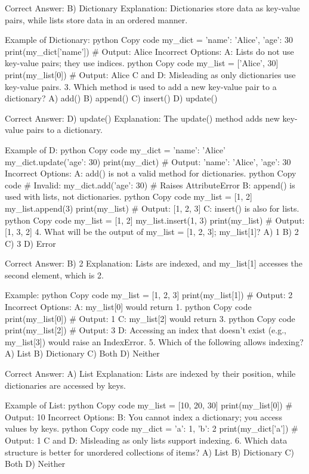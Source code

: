 Correct Answer: B) Dictionary
Explanation: Dictionaries store data as key-value pairs, while lists store data in an ordered manner.

Example of Dictionary:
python
Copy code
my_dict = {'name': 'Alice', 'age': 30}
print(my_dict['name'])  # Output: Alice
Incorrect Options:
A: Lists do not use key-value pairs; they use indices.
python
Copy code
my_list = ['Alice', 30]
print(my_list[0])  # Output: Alice
C and D: Misleading as only dictionaries use key-value pairs.
3. Which method is used to add a new key-value pair to a dictionary?
A) add()
B) append()
C) insert()
D) update()

Correct Answer: D) update()
Explanation: The update() method adds new key-value pairs to a dictionary.

Example of D:
python
Copy code
my_dict = {'name': 'Alice'}
my_dict.update({'age': 30})
print(my_dict)  # Output: {'name': 'Alice', 'age': 30}
Incorrect Options:
A: add() is not a valid method for dictionaries.
python
Copy code
# Invalid: my_dict.add({'age': 30})  # Raises AttributeError
B: append() is used with lists, not dictionaries.
python
Copy code
my_list = [1, 2]
my_list.append(3)
print(my_list)  # Output: [1, 2, 3]
C: insert() is also for lists.
python
Copy code
my_list = [1, 2]
my_list.insert(1, 3)
print(my_list)  # Output: [1, 3, 2]
4. What will be the output of my_list = [1, 2, 3]; my_list[1]?
A) 1
B) 2
C) 3
D) Error

Correct Answer: B) 2
Explanation: Lists are indexed, and my_list[1] accesses the second element, which is 2.

Example:
python
Copy code
my_list = [1, 2, 3]
print(my_list[1])  # Output: 2
Incorrect Options:
A: my_list[0] would return 1.
python
Copy code
print(my_list[0])  # Output: 1
C: my_list[2] would return 3.
python
Copy code
print(my_list[2])  # Output: 3
D: Accessing an index that doesn't exist (e.g., my_list[3]) would raise an IndexError.
5. Which of the following allows indexing?
A) List
B) Dictionary
C) Both
D) Neither

Correct Answer: A) List
Explanation: Lists are indexed by their position, while dictionaries are accessed by keys.

Example of List:
python
Copy code
my_list = [10, 20, 30]
print(my_list[0])  # Output: 10
Incorrect Options:
B: You cannot index a dictionary; you access values by keys.
python
Copy code
my_dict = {'a': 1, 'b': 2}
print(my_dict['a'])  # Output: 1
C and D: Misleading as only lists support indexing.
6. Which data structure is better for unordered collections of items?
A) List
B) Dictionary
C) Both
D) Neither

